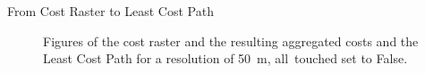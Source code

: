 \documentclass[usenames,dvipsnames,aspectratio=169]{beamer}
\begin{document}
	\begin{frame}{From Cost Raster to Least Cost Path}
		\begin{figure}
			\centering
			\enskip
			\enskip
			
			\caption{Figures of the cost raster and the resulting aggregated costs and the Least Cost Path for a resolution of 50~m, all~touched set to False.}
			\label{fig:costs2path}
		\end{figure}
	\end{frame}
	
\end{document}
